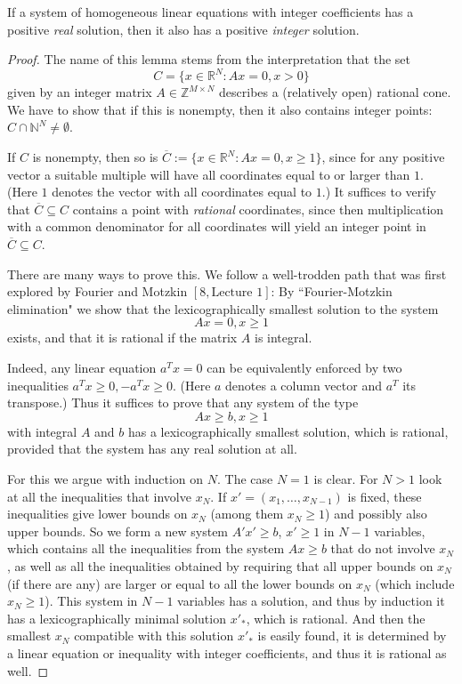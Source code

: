 \begin{lemma}
  \label{cone_lemma}
  If a system of homogeneous linear equations with integer
  coefficients has a positive \emph{real} solution, then it also has a positive
  \emph{integer} solution.
\end{lemma}
\begin{proof}
   The name of this lemma stems from the interpretation that the set
  \[
  C = \{x \in \mathbb{R}^N : Ax = 0, x > 0\}
  \]
  given by an integer matrix \( A \in \mathbb{Z}^{M \times N} \) describes a (relatively open) rational
  cone. We have to show that if this is nonempty, then it also contains integer
  points: \( C \cap \mathbb{N}^N \neq \emptyset \).

  If \( C \) is nonempty, then so is \(\overline{C} := \{x \in \mathbb{R}^N : Ax = 0, x \geq 1\}\), since
  for any positive vector a suitable multiple will have all coordinates equal to or
  larger than $1$. (Here $1$ denotes the vector with all coordinates equal to $1$.)
  It suffices to verify that \( \overline{C} \subseteq C \) contains a point with \emph{rational}
  coordinates, since then multiplication with a common denominator for all coordinates
  will yield an integer point in \( \overline{C} \subseteq C \).

  There are many ways to prove this. We follow a well-trodden path that was
  first explored by Fourier and Motzkin \([8, \text{Lecture 1}]\): By ``Fourier-Motzkin
  elimination" we show that the lexicographically smallest solution to the
  system
  \[
  Ax = 0, x \geq 1
  \]
  exists, and that it is rational if the matrix \( A \) is integral.

  Indeed, any linear equation \( a^T x = 0 \) can be equivalently enforced by two
  inequalities \( a^T x \geq 0, -a^T x \geq 0 \). (Here \( a \) denotes a column vector and
  \( a^T \) its transpose.) Thus it suffices to prove that any system of the type
  \[
  Ax \geq b, x \geq 1
  \]
  with integral \( A \) and \( b \) has a lexicographically smallest solution, which is
  rational, provided that the system has any real solution at all.

  For this we argue with induction on \( N \). The case \( N = 1 \) is clear. For \( N > 1 \)
  look at all the inequalities that involve \( x_N \). If \( x' = (x_1, \ldots, x_{N-1}) \) is fixed,
  these inequalities give lower bounds on \( x_N \) (among them \( x_N \geq 1 \)) and
  possibly also upper bounds. So we form a new system \( A' x' \geq b \), \( x' \geq 1 \)
  in \( N-1 \) variables, which contains all the inequalities from the system
  \( Ax \geq b \) that do not involve \( x_N \), as well as all the inequalities obtained
  by requiring that all upper bounds on \( x_N \) (if there are any) are larger or
  equal to all the lower bounds on \( x_N \) (which include \( x_N \geq 1 \)). This system
  in \( N-1 \) variables has a solution, and thus by induction it has a lexicographically
  minimal solution \( x'_*\), which is rational. And then the smallest
  \( x_N \) compatible with this solution \( x'_*\) is easily found, it is determined by a
  linear equation or inequality with integer coefficients, and thus it is rational as well.
\end{proof}


